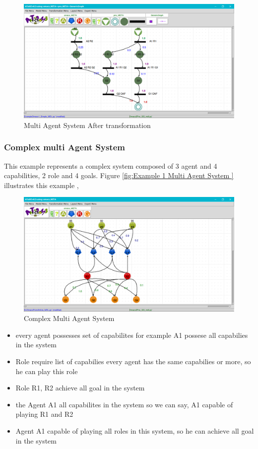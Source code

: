 \begin{figure}[th]
	\centering
 	\includegraphics[scale=0.3]{ch3/img/ex1pns}
	\caption{\label{fig:Multi Agent System After transformation }Multi Agent System After transformation}
\end{figure}  
\pagebreak
\subsubsection{ Complex multi Agent System }
This example represents a complex system composed of  3 agent and 4 capabilities, 2 role and 4 goals. Figure \ref{fig:Example 1 Multi Agent System } illustrates this example ,
 


\begin{figure}[th]
	\centering
 	\includegraphics[scale=0.3]{ch3/img/article}
	\caption{\label{fig:Complex Multi Agent System}Complex Multi Agent System}
\end{figure} 

\begin{itemize}
	\item every agent possesses set of capabilites for example A1 possese all capabilies in the system
	\item Role require list of capabilies every agent has the same capabilies or more, so he can play this role
	\item Role R1, R2 achieve all goal in the system
	\item the Agent A1 all capabilites in the system so we can say, A1 capable of playing R1 and R2
	\item Agent A1 capable of playing all roles in this system, so he can achieve all goal in the system
\end{itemize}
\vspace{2cm}

